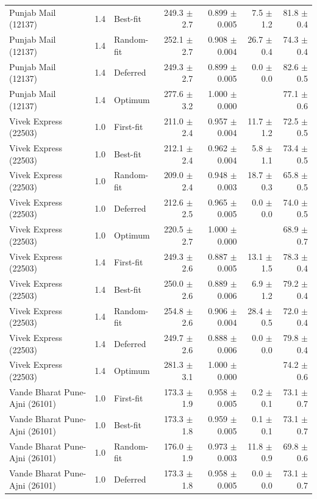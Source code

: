\begin{tabular}{lllrrrr}
Punjab Mail (12137) & 1.4 & Best-fit & 249.3 $\pm$ 2.7 & 0.899 $\pm$ 0.005 & 7.5 $\pm$ 1.2 & 81.8 $\pm$ 0.4 \\
Punjab Mail (12137) & 1.4 & Random-fit & 252.1 $\pm$ 2.7 & 0.908 $\pm$ 0.004 & 26.7 $\pm$ 0.4 & 74.3 $\pm$ 0.4 \\
Punjab Mail (12137) & 1.4 & Deferred & 249.3 $\pm$ 2.7 & 0.899 $\pm$ 0.005 & 0.0 $\pm$ 0.0 & 82.6 $\pm$ 0.5 \\
Punjab Mail (12137) & 1.4 & Optimum & 277.6 $\pm$ 3.2 & 1.000 $\pm$ 0.000 &  & 77.1 $\pm$ 0.6 \\
Vivek Express (22503) & 1.0 & First-fit & 211.0 $\pm$ 2.4 & 0.957 $\pm$ 0.004 & 11.7 $\pm$ 1.2 & 72.5 $\pm$ 0.5 \\
Vivek Express (22503) & 1.0 & Best-fit & 212.1 $\pm$ 2.4 & 0.962 $\pm$ 0.004 & 5.8 $\pm$ 1.1 & 73.4 $\pm$ 0.5 \\
Vivek Express (22503) & 1.0 & Random-fit & 209.0 $\pm$ 2.4 & 0.948 $\pm$ 0.003 & 18.7 $\pm$ 0.3 & 65.8 $\pm$ 0.5 \\
Vivek Express (22503) & 1.0 & Deferred & 212.6 $\pm$ 2.5 & 0.965 $\pm$ 0.005 & 0.0 $\pm$ 0.0 & 74.0 $\pm$ 0.5 \\
Vivek Express (22503) & 1.0 & Optimum & 220.5 $\pm$ 2.7 & 1.000 $\pm$ 0.000 &  & 68.9 $\pm$ 0.7 \\
Vivek Express (22503) & 1.4 & First-fit & 249.3 $\pm$ 2.6 & 0.887 $\pm$ 0.005 & 13.1 $\pm$ 1.5 & 78.3 $\pm$ 0.4 \\
Vivek Express (22503) & 1.4 & Best-fit & 250.0 $\pm$ 2.6 & 0.889 $\pm$ 0.006 & 6.9 $\pm$ 1.2 & 79.2 $\pm$ 0.4 \\
Vivek Express (22503) & 1.4 & Random-fit & 254.8 $\pm$ 2.6 & 0.906 $\pm$ 0.004 & 28.4 $\pm$ 0.5 & 72.0 $\pm$ 0.4 \\
Vivek Express (22503) & 1.4 & Deferred & 249.7 $\pm$ 2.6 & 0.888 $\pm$ 0.006 & 0.0 $\pm$ 0.0 & 79.8 $\pm$ 0.4 \\
Vivek Express (22503) & 1.4 & Optimum & 281.3 $\pm$ 3.1 & 1.000 $\pm$ 0.000 &  & 74.2 $\pm$ 0.6 \\
Vande Bharat Pune-Ajni (26101) & 1.0 & First-fit & 173.3 $\pm$ 1.9 & 0.958 $\pm$ 0.005 & 0.2 $\pm$ 0.1 & 73.1 $\pm$ 0.7 \\
Vande Bharat Pune-Ajni (26101) & 1.0 & Best-fit & 173.3 $\pm$ 1.8 & 0.959 $\pm$ 0.005 & 0.1 $\pm$ 0.1 & 73.1 $\pm$ 0.7 \\
Vande Bharat Pune-Ajni (26101) & 1.0 & Random-fit & 176.0 $\pm$ 1.9 & 0.973 $\pm$ 0.003 & 11.8 $\pm$ 0.9 & 69.8 $\pm$ 0.6 \\
Vande Bharat Pune-Ajni (26101) & 1.0 & Deferred & 173.3 $\pm$ 1.8 & 0.958 $\pm$ 0.005 & 0.0 $\pm$ 0.0 & 73.1 $\pm$ 0.7 \\

\end{tabular}
